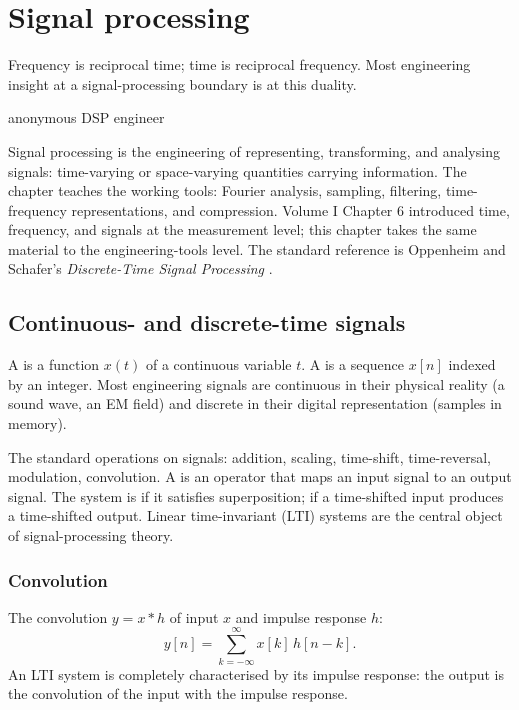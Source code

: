 \chapter{Signal processing}
\label{vol07:ch15}

\epigraph{Frequency is reciprocal time; time is reciprocal frequency. Most engineering insight at a signal-processing boundary is at this duality.}{anonymous DSP engineer}


\noindent
Signal processing is the engineering of representing, transforming, and analysing signals: time-varying or space-varying quantities carrying information. The chapter teaches the working tools: Fourier analysis, sampling, filtering, time-frequency representations, and compression. Volume I Chapter 6 introduced time, frequency, and signals at the measurement level; this chapter takes the same material to the engineering-tools level. The standard reference is Oppenheim and Schafer's \emph{Discrete-Time Signal Processing} \cite{text:oppenheim-schafer}.

\section{Continuous- and discrete-time signals}

A  is a function $x(t)$ of a continuous variable $t$. A  is a sequence $x[n]$ indexed by an integer. Most engineering signals are continuous in their physical reality (a sound wave, an EM field) and discrete in their digital representation (samples in memory).

The standard operations on signals: addition, scaling, time-shift, time-reversal, modulation, convolution. A  is an operator that maps an input signal to an output signal. The system is  if it satisfies superposition;  if a time-shifted input produces a time-shifted output. Linear time-invariant (LTI) systems are the central object of signal-processing theory.

\subsection{Convolution}

The convolution $y = x * h$ of input $x$ and impulse response $h$:
\[
y[n] = \sum_{k=-\infty}^{\infty} x[k] \, h[n-k].
\]
An LTI system is completely characterised by its impulse response: the output is the convolution of the input with the impulse response.

